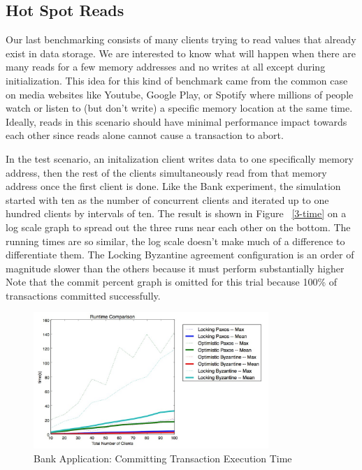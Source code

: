 \documentclass[10pt,twocolumn]{article}
\begin{document}
\subsection{Hot Spot Reads}
Our last benchmarking consists of many clients trying to read values that already exist in data storage.  We are interested to know what will happen when there are many reads for a few memory addresses and no writes at all except during initialization. This idea for this kind of benchmark came from the common case on media websites like Youtube, Google Play, or Spotify where millions of people watch or listen to (but don't write)  a specific memory location at the same time. Ideally, reads in this scenario should have minimal performance impact towards each other since reads alone cannot cause a transaction to abort. 

In the test scenario, an initalization client writes data to one specifically memory address, then the rest of the clients simultaneously read from that memory address once the first client is done. Like the Bank experiment, the simulation started with ten as the number of concurrent clients and iterated up to one hundred clients by intervals of ten. The result is shown in Figure ~\ref{3-time} on a log scale graph to spread out the three runs near each other on the bottom. The running times are so similar, the log scale doesn't make much of a difference to differentiate them. The Locking Byzantine agreement configuration is an order of magnitude slower than the others because it must perform substantially higher Note that the commit percent graph is omitted for this trial because 100\% of transactions committed successfully.

\begin{figure}[!b]
  \begin{center}
    \includegraphics[width=3.5in]{Images/2-time.png}
  \end{center}

  \caption{\small Bank Application: Committing Transaction Execution Time }
  \label{2-time}
\end{figure}
\end{document}

